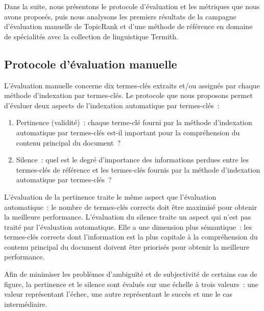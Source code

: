    Dans la suite, nous présentons le protocole d'évaluation et les métriques
    que nous avons proposés, puis nous analysons les premiers résultats de la
    campagne d'évaluation manuelle de TopicRank et d'une méthode de référence en
    domaine de spécialités avec la collection de linguistique Termith.
    

    \subsection{Protocole d'évaluation manuelle}
    \label{subsec:main-automatic_evaluation_of_keyphrase_annotation-methodology-evaluation_protocol}
      L'évaluation manuelle concerne dix termes-clés extraits et/ou assignés par
      chaque méthode d'indexation par termes-clés. Le protocole que nous
      proposons permet d'évaluer deux aspects de l'indexation automatique par
      termes-clés~:
      \begin{enumerate}
        \item{Pertinence (validité)~: chaque terme-clé fourni par la méthode
              d'indexation automatique par termes-clés est-il important pour la
              compréhension du contenu principal du document~?}
        \item{Silence~: quel est le degré d'importance des informations perdues
              entre les termes-clés de référence et les termes-clés fournis par
              la méthode d'indexation automatique par termes-clés~?}
      \end{enumerate}
      L'évaluation de la pertinence traite le même aspect que l'évaluation
      automatique~: le nombre de termes-clés corrects doit être maximisé pour
      obtenir la meilleure performance. L'évaluation du silence traite un aspect
      qui n'est pas traité par l'évaluation automatique. Elle a une dimension
      plus sémantique~: les termes-clés corrects dont l'information est la plus
      capitale à la compréhension du contenu principal du document doivent être
      priorisés pour obtenir la meilleure performance.

      Afin de minimiser les problèmes d'ambiguïté et de subjectivité de certains
      cas de figure, la pertinence et le silence sont évalués sur une échelle à
      trois valeurs~: une valeur représentant l'échec, une autre représentant le
      succès et une le cas intermédiaire.

